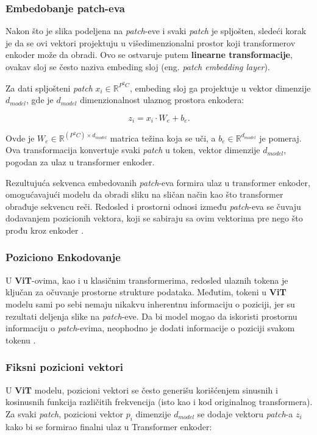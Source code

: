 \documentclass[12pt]{article}
\begin{document}
   \subsubsection*{Embedobanje patch-eva}

   Nakon što je slika podeljena na \textit{patch}-eve i svaki \textit{patch} je spljošten, 
   sledeći korak je da se ovi vektori projektuju u višedimenzionalni prostor koji transformerov 
   enkoder može da obradi. Ovo se ostvaruje putem \textbf{linearne transformacije}, ovakav sloj 
   se često naziva embeding sloj (eng. \textit{patch embedding layer}).

   Za dati spljošteni \textit{patch} \( x_i \in \mathbb{R}^{P^2C} \), embeding sloj 
   ga projektuje u vektor dimenzije \( d_{model} \), gde je \( d_{model} \) dimenzionalnost 
   ulaznog prostora enkodera:

   \[
   z_i = x_i \cdot W_e + b_e.
   \]

   Ovde je \( W_e \in \mathbb{R}^{(P^2C) \times d_{model}} \) matrica težina koja se uči, 
   a \( b_e \in \mathbb{R}^{d_{model}} \) je pomeraj. Ova transformacija konvertuje svaki 
   \textit{patch} u token, vektor dimenzije \( d_{model} \), pogodan za ulaz u transformer enkoder.

   Rezultujuća sekvenca embedovanih \textit{patch}-eva formira ulaz u transformer enkoder, 
   omogućavajući modelu da obradi sliku na sličan način kao što transformer obrađuje sekvencu reči. 
   Redosled i prostorni odnosi između \textit{patch}-eva se čuvaju dodavanjem pozicionih vektora, 
   koji se sabiraju sa ovim vektorima pre nego što prođu kroz enkoder \cite{gordic}.

   \subsubsection{Poziciono Enkodovanje}
   U \textbf{ViT}-ovima, kao i u klasičnim transformerima, redosled ulaznih tokena je ključan 
   za očuvanje prostorne strukture podataka. Međutim, tokeni u \textbf{ViT} modelu sami po sebi 
   nemaju nikakvu inherentnu informaciju o poziciji, jer su rezultati deljenja slike na 
   \textit{patch}-eve. Da bi model mogao da iskoristi prostornu informaciju o \textit{patch}-evima, 
   neophodno je dodati informacije o poziciji svakom tokenu \cite{vit}.


   \subsubsection*{Fiksni pozicioni vektori}
   U \textbf{ViT} modelu, pozicioni vektori se često generišu korišćenjem sinusnih i kosinusnih 
   funkcija različitih frekvencija (isto kao i kod originalnog transformera). Za svaki 
   \textit{patch}, pozicioni vektor \( p_i \) dimenzije \( d_{model} \) se dodaje 
   vektoru \textit{patch}-a \( z_i \) kako bi se formirao finalni ulaz u Transformer enkoder:
\end{document}
